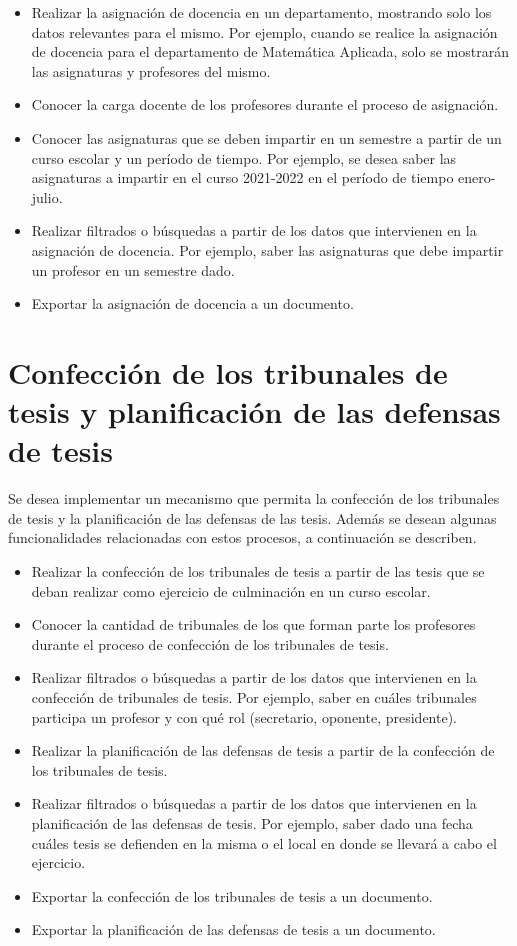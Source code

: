 \begin{itemize}
    \item Realizar la asignación de docencia en un departamento, mostrando solo los datos relevantes 
     para el mismo. Por ejemplo, cuando se realice la asignación de docencia para el departamento de Matemática Aplicada, solo 
     se mostrarán las asignaturas y profesores del mismo.
    \item Conocer la carga docente de los profesores durante el proceso de asignación.
    \item Conocer las asignaturas que se deben impartir en un semestre a partir de un curso escolar y un período de tiempo. 
          Por ejemplo, se desea saber las asignaturas a impartir en el curso 2021-2022 en el período de tiempo enero-julio.
    \item Realizar filtrados o búsquedas a partir de los datos que intervienen en la asignación 
          de docencia. Por ejemplo, saber las asignaturas que debe impartir un profesor en un semestre dado.
    \item Exportar la asignación de docencia a un documento.

\end{itemize}


\section{Confección de los tribunales de tesis y planificación de las defensas de tesis}
Se desea implementar un mecanismo que permita la confección de los tribunales de tesis y 
la planificación de las defensas de las tesis. Además se desean algunas funcionalidades 
relacionadas con estos procesos, a continuación se describen.

\begin{itemize}
    \item Realizar la confección de los tribunales de tesis a partir de las tesis que se deban realizar como ejercicio de 
    culminación en un curso escolar.
    \item Conocer la cantidad de tribunales de los que forman parte los profesores durante el proceso 
    de confección de los tribunales de tesis.
    \item Realizar filtrados o búsquedas a partir de los datos que intervienen en la confección 
          de tribunales de tesis. Por ejemplo, saber en cuáles tribunales participa un profesor y con qué rol (secretario, oponente, presidente).
    \item Realizar la planificación de las defensas de tesis a partir de la confección de los tribunales de tesis.
    \item Realizar filtrados o búsquedas a partir de los datos que intervienen en la planificación 
    de las defensas de tesis. Por ejemplo, saber dado una fecha cuáles tesis se defienden en la misma o el local 
    en donde se llevará a cabo el ejercicio.
    \item Exportar la confección de los tribunales de tesis a un documento.
    \item Exportar la planificación de las defensas de tesis a un documento.

\end{itemize}


